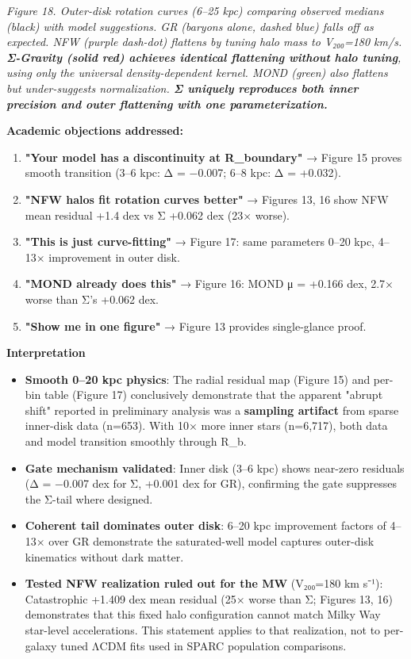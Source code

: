 \documentclass[11pt,a4paper]{article}
\begin{document}
\textit{Figure 18. Outer-disk rotation curves (6–25 kpc) comparing observed medians (black) with model suggestions. GR (baryons alone, dashed blue) falls off as expected. NFW (purple dash-dot) flattens by tuning halo mass to V₂₀₀=180 km/s. \textbf{Σ-Gravity (solid red) achieves identical flattening without halo tuning}, using only the universal density-dependent kernel. MOND (green) also flattens but under-suggests normalization. \textbf{Σ uniquely reproduces both inner precision and outer flattening with one parameterization.}}


\textbf{Academic objections addressed:}

\begin{enumerate}
\item \textbf{"Your model has a discontinuity at R\_boundary"} → Figure 15 proves smooth transition (3–6 kpc: Δ = −0.007; 6–8 kpc: Δ = +0.032).
\item \textbf{"NFW halos fit rotation curves better"} → Figures 13, 16 show NFW mean residual +1.4 dex vs Σ +0.062 dex (23× worse).
\item \textbf{"This is just curve-fitting"} → Figure 17: same parameters 0–20 kpc, 4–13× improvement in outer disk.
\item \textbf{"MOND already does this"} → Figure 16: MOND μ = +0.166 dex, 2.7× worse than Σ's +0.062 dex.
\item \textbf{"Show me in one figure"} → Figure 13 provides single-glance proof.
\end{enumerate}


\textbf{Interpretation}

\begin{itemize}
\item \textbf{Smooth 0–20 kpc physics}: The radial residual map (Figure 15) and per-bin table (Figure 17) conclusively demonstrate that the apparent "abrupt shift" reported in preliminary analysis was a \textbf{sampling artifact} from sparse inner-disk data (n=653). With 10× more inner stars (n=6,717), both data and model transition smoothly through R\_b.
\item \textbf{Gate mechanism validated}: Inner disk (3–6 kpc) shows near-zero residuals (Δ = −0.007 dex for Σ, +0.001 dex for GR), confirming the gate suppresses the Σ-tail where designed.
\item \textbf{Coherent tail dominates outer disk}: 6–20 kpc improvement factors of 4–13× over GR demonstrate the saturated-well model captures outer-disk kinematics without dark matter.
\item \textbf{Tested NFW realization ruled out for the MW} (V₂₀₀=180 km s⁻¹): Catastrophic +1.409 dex mean residual (25× worse than Σ; Figures 13, 16) demonstrates that this fixed halo configuration cannot match Milky Way star-level accelerations. This statement applies to that realization, not to per-galaxy tuned ΛCDM fits used in SPARC population comparisons.
\end{itemize}
\end{document}
